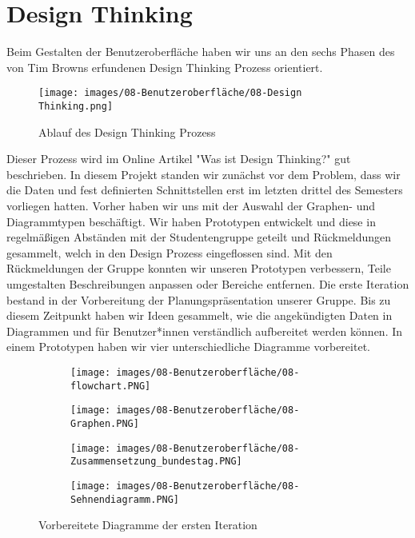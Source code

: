 \section{Design Thinking}\label{sec:08_04_Design_Thinking}
Beim Gestalten der Benutzeroberfläche haben wir uns an den sechs Phasen des von Tim Browns erfundenen Design Thinking Prozess orientiert. 

\begin{figure}[hbt!]
    \centering
    \texttt{[image: images/08-Benutzeroberfläche/08-Design Thinking.png]}
    \caption{Ablauf des Design Thinking Prozess}
\end{figure}

Dieser Prozess wird im Online Artikel "Was ist Design Thinking?"\cite{DeTh} gut beschrieben. 
In diesem Projekt standen wir zunächst vor dem Problem, dass wir die Daten und fest definierten Schnittstellen erst im letzten drittel des Semesters vorliegen hatten. Vorher haben wir uns mit der Auswahl der Graphen- und Diagrammtypen beschäftigt. Wir haben Prototypen entwickelt und diese in regelmäßigen Abständen mit der Studentengruppe geteilt und Rückmeldungen gesammelt, welch in den Design Prozess eingeflossen sind. Mit den Rückmeldungen der Gruppe konnten wir unseren Prototypen verbessern, Teile umgestalten Beschreibungen anpassen oder Bereiche entfernen.
Die erste Iteration bestand in der Vorbereitung der Planungspräsentation unserer Gruppe. Bis zu diesem Zeitpunkt haben wir Ideen gesammelt, wie die angekündigten Daten in Diagrammen und für Benutzer*innen verständlich aufbereitet werden können. In einem Prototypen haben wir vier unterschiedliche Diagramme vorbereitet.

\begin{figure}[hbt!]%
    \centering
    \begin{subfigure}
        \centering
        \texttt{[image: images/08-Benutzeroberfläche/08-flowchart.PNG]}
    \end{subfigure}
    \qquad
    \begin{subfigure}
         \centering
         \texttt{[image: images/08-Benutzeroberfläche/08-Graphen.PNG]}
    \end{subfigure}
    \qquad
    \begin{subfigure}
         \centering
        \texttt{[image: images/08-Benutzeroberfläche/08-Zusammensetzung\_bundestag.PNG]}
  \end{subfigure}
  \qquad
  \begin{subfigure}
        \centering
        \texttt{[image: images/08-Benutzeroberfläche/08-Sehnendiagramm.PNG]}
  \end{subfigure}
  \caption{Vorbereitete Diagramme der ersten Iteration}%
\end{figure}

